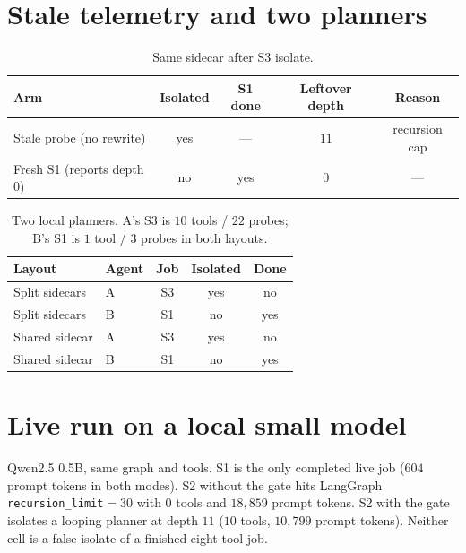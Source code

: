 \documentclass[11pt,a4paper]{article}
\begin{document}
\appendix

\section{Stale telemetry and two planners}
\label{app:stale}

\begin{table}[htbp]
\centering
\caption{Same sidecar after S3 isolate.}
\label{tab:persist}
\small
\begin{tabular}{@{}lcccc@{}}
\toprule
Arm & Isolated & S1 done & Leftover depth & Reason \\
\midrule
Stale probe (no rewrite) & yes & --- & $11$ & recursion cap \\
Fresh S1 (reports depth $0$) & no & yes & $0$ & --- \\
\bottomrule
\end{tabular}
\end{table}

\begin{table}[htbp]
\centering
\caption{Two local planners. A's S3 is $10$ tools / $22$ probes; B's S1 is $1$ tool / $3$ probes in both layouts.}
\label{tab:two}
\small
\begin{tabular}{@{}llccc@{}}
\toprule
Layout & Agent & Job & Isolated & Done \\
\midrule
Split sidecars & A & S3 & yes & no \\
Split sidecars & B & S1 & no & yes \\
Shared sidecar & A & S3 & yes & no \\
Shared sidecar & B & S1 & no & yes \\
\bottomrule
\end{tabular}
\end{table}

\section{Live run on a local small model}
\label{app:live}

Qwen2.5 0.5B, same graph and tools.
S1 is the only completed live job ($604$ prompt tokens in both modes).
S2 without the gate hits LangGraph \texttt{recursion\_limit}$=30$ with $0$ tools and $18{,}859$ prompt tokens.
S2 with the gate isolates a looping planner at depth $11$ ($10$ tools, $10{,}799$ prompt tokens).
Neither cell is a false isolate of a finished eight-tool job.
\end{document}
